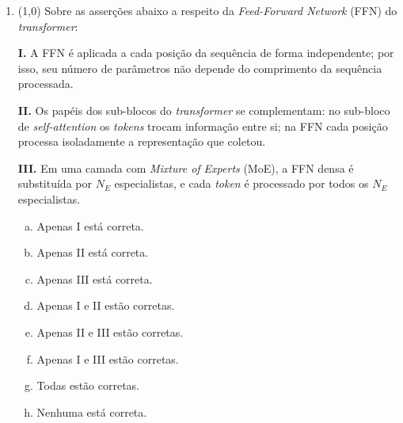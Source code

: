 \documentclass[11pt,a4paper]{article}
\begin{document}
\begin{enumerate}[1)]
\begin{enumerate}[a)]
    \item Para reduzir o número de parâmetros treináveis do bloco, já que parte do sinal segue adiante sem passar por matrizes de peso.
    \item Para introduzir a não linearidade do bloco, uma vez que atenção e projeções lineares seriam operações lineares sem o resíduo.
    \item Para manter o gradiente fluindo através da pilha de blocos, permitindo empilhar muitas camadas mitigando a degradação do gradiente.
    \item Para carregar a informação posicional às camadas profundas, dispensando a soma do \textit{positional encoding} na entrada da rede.
    \item Para atuar como regularização estocástica, desligando aleatoriamente sub-blocos inteiros durante cada iteração de treinamento.
    \item Para garantir a causalidade da atenção, impedindo que posições futuras contaminem o resíduo somado à posição atual.
    \item Para permitir sequências de comprimento variável, pois a soma residual ajusta a dimensão temporal da entrada de cada bloco.
    \item Para normalizar a variância dos \textit{scores} de atenção, substituindo o fator $1/\sqrt{d}$ nas camadas mais profundas da pilha.
\end{enumerate}

\item (1{,}0) Sobre as asserções abaixo a respeito da \textit{Feed-Forward Network} (FFN) do \textit{transformer}:

\textbf{I.} A FFN é aplicada a cada posição da sequência de forma independente; por isso, seu número de parâmetros não depende do comprimento da sequência processada.

\textbf{II.} Os papéis dos sub-blocos do \textit{transformer} se complementam: no sub-bloco de \textit{self-attention} os \textit{tokens} trocam informação entre si; na FFN cada posição processa isoladamente a representação que coletou.

\textbf{III.} Em uma camada com \textit{Mixture of Experts} (MoE), a FFN densa é substituída por $N_E$ especialistas, e cada \textit{token} é processado por todos os $N_E$ especialistas.

\begin{enumerate}[a)]
    \item Apenas I está correta.
    \item Apenas II está correta.
    \item Apenas III está correta.
    \item Apenas I e II estão corretas.
    \item Apenas II e III estão corretas.
    \item Apenas I e III estão corretas.
    \item Todas estão corretas.
    \item Nenhuma está correta.
\end{enumerate}


\end{enumerate}
\end{document}
